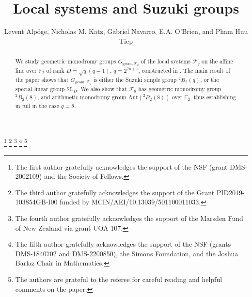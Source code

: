 \documentclass[11pt]{amsart}
\theoremstyle{plain}
\theoremstyle{definition}
\numberwithin{thm}{section}
\numberwithin{equation}{thm}
\newcommand{\Aut}{\mathrm{Aut}}
\newcommand{\SL}{\mathrm{SL}}
\newcommand{\sF}{{\mathcal F}}
\newcommand{\F}{{\mathbb F}}
\newcommand{\0}{\emptyset}
\newcommand{\geo}{{\mathrm {geom}}}
\newcommand{\tw}[1]{{}^#1\!}
\begin{document}
\title{Local systems and Suzuki groups}
\author[Alp\"oge, Katz, Navarro, O'Brien, and Tiep]
{Levent Alp\"oge, Nicholas M. Katz, Gabriel Navarro, E.A. O'Brien, and Pham Huu Tiep}
\address{L. Alp\"oge, Department of Mathematics, Harvard University, Cambridge, MA 02138, U.S.A.}
\address{N.M. Katz, Department of Mathematics, Princeton University, Princeton, NJ 08544,U.S.A.}
\address{G. Navarro, Departament de Matem\`atiques, Universitat de Val\`encia, 46100
Burjassot, Val\`encia, Spain}
\address{E.A. O'Brien, University of Auckland,  Auckland, New Zealand}
\address{P.H. Tiep, Department of Mathematics, Rutgers University, Piscataway, NJ 08854, U.S.A.}
\thanks{The first author gratefully acknowledges the support of the NSF (grant DMS-2002109) and the Society of Fellows.}
\thanks{The third author gratefully acknowledges the support of the Grant PID2019-103854GB-I00 funded by MCIN/AEI\-/10.13039\-/501100011033.}
\thanks{The fourth author gratefully acknowledges  the support of the Marsden Fund of New Zealand via  grant UOA 107.}
\thanks{The fifth author gratefully acknowledges the support of the NSF (grants DMS-1840702 and DMS-2200850), the Simons Foundation, and the Joshua Barlaz Chair in Mathematics.}
\thanks{The authors are grateful to the referee for careful reading and helpful comments on the paper.}

\maketitle

\begin{abstract}
We study geometric monodromy groups $G_{\geo,\sF_q}$ of the local systems $\sF_q$ on the affine line over $\F_2$ 
of rank $D=\sqrt{q}(q-1)$, $q=2^{2n+1}$, constructed in \cite{Ka-ERS}. The main result of the paper shows that $G_{\geo,\sF_q}$ is either the Suzuki simple group
$\tw2 B_2(q)$, or the special linear group $\SL_D$. We also show that $\sF_8$ has geometric monodromy group
$\tw2B_2(8)$, and arithmetic monodromy group $\Aut(\tw2 B_2(8))$ over $\F_2$, thus establishing \cite[Conjecture 2.2]{Ka-ERS}
in full in the case $q=8$.
\end{abstract}

\tableofcontents
\end{document}
